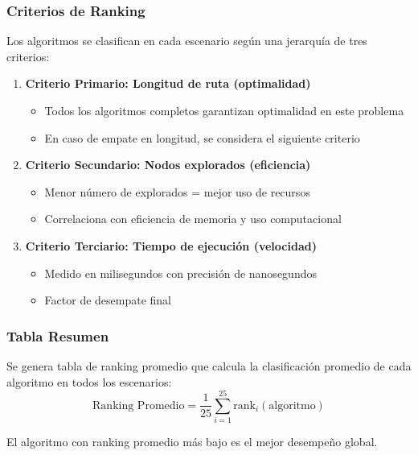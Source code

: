 \documentclass[12pt,a4paper]{article}
\begin{document}
\subsubsection{Criterios de Ranking}

Los algoritmos se clasifican en cada escenario según una jerarquía de tres criterios:

\begin{enumerate}
    \item \textbf{Criterio Primario: Longitud de ruta (optimalidad)}
    \begin{itemize}
        \item Todos los algoritmos completos garantizan optimalidad en este problema
        \item En caso de empate en longitud, se considera el siguiente criterio
    \end{itemize}
    
    \item \textbf{Criterio Secundario: Nodos explorados (eficiencia)}
    \begin{itemize}
        \item Menor número de explorados = mejor uso de recursos
        \item Correlaciona con eficiencia de memoria y uso computacional
    \end{itemize}
    
    \item \textbf{Criterio Terciario: Tiempo de ejecución (velocidad)}
    \begin{itemize}
        \item Medido en milisegundos con precisión de nanosegundos
        \item Factor de desempate final
    \end{itemize}
\end{enumerate}

\subsubsection{Tabla Resumen}

Se genera tabla de ranking promedio que calcula la clasificación promedio de cada algoritmo en todos los escenarios:
\begin{equation}
    \text{Ranking Promedio} = \frac{1}{25} \sum_{i=1}^{25} \text{rank}_i(\text{algoritmo})
\end{equation}

El algoritmo con ranking promedio más bajo es el mejor desempeño global.
\end{document}
